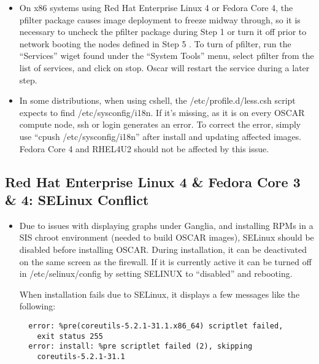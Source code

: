 \begin{itemize}
\item On x86 systems using Red Hat Enterprise Linux 4 or Fedora Core 4,
  the pfilter package causes image deployment to freeze midway through,
  so it is necessary to uncheck the pfilter package during Step 1 
   or turn it off prior to 
  network booting the nodes defined in Step 5 .
  To turn of pfilter, run the ``Services'' wiget found under the
  ``System Tools'' menu, select pfilter from the list of services, and
  click on stop.  Oscar will restart the service during a later step.

\item In some distributions, when using cshell, the 
  /etc/profile.d/less.csh script expects to find /etc/sysconfig/i18n. If 
  it's missing, as it is on every OSCAR compute node, ssh or login
  generates an error.  To correct the error, simply use 
  ``cpush /etc/sysconfig/i18n'' after install and updating affected images.
  Fedora Core 4 and RHEL4U2 should not be affected by this issue.

\end{itemize}


\subsection{Red Hat Enterprise Linux 4 \& Fedora Core 3 \& 4: SELinux Conflict }
\label{subsec:SELinuxnotes}

\begin{itemize}

\item Due to issues with displaying graphs under Ganglia, and installing
  RPMs in a SIS chroot environment (needed to build OSCAR images), SELinux 
  should be disabled before installing OSCAR.  During installation, it can be
  deactivated on the same screen as the firewall.  If it is currently
  active it can be turned off in /etc/selinux/config by setting SELINUX 
  to ``disabled'' and rebooting.

  When installation fails due to SELinux, it displays a few messages like the following:
  \begin{verbatim}
  error: %pre(coreutils-5.2.1-31.1.x86_64) scriptlet failed, 
    exit status 255
  error: install: %pre scriptlet failed (2), skipping 
    coreutils-5.2.1-31.1
  \end{verbatim}
\end{itemize}

